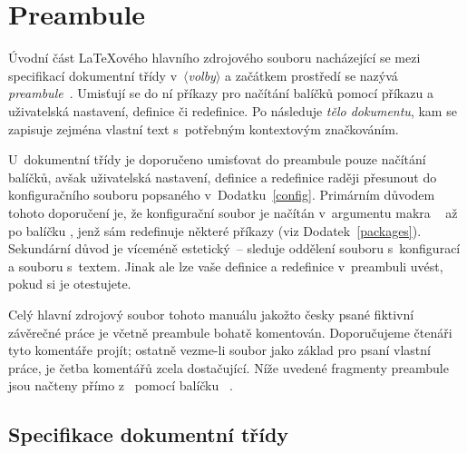 
\chapter{Preambule}\label{preamble}%

Úvodní část \LaTeX ového hlavního zdrojového souboru nacházející se mezi
specifikací dokumentní třídy v~\pgm{\textbackslash
  documentclass[}$\langle$\emph{volby}$\rangle$\pgm{]\{\ipotname\}} a začátkem
prostředí \verb!! se nazývá
  \emph{preambule}~\cite{Ryb:2005:LaTeX:3}. Umisťují se do ní příkazy pro
  načítání balíčků pomocí příkazu  a
  uživatelská nastavení, definice či redefinice. Po \verb!!
    následuje \emph{tělo dokumentu}, kam se zapisuje zejména vlastní text
s~potřebným kontextovým značkováním.

U~dokumentní třídy  je doporučeno umisťovat do preambule
pouze načítání balíčků, avšak uživatelská nastavení, definice a redefinice
raději přesunout do konfiguračního souboru  popsaného
v~Dodatku~\ref{config}. Primárním důvodem tohoto doporučení je, že
konfigurační soubor  je načítán v~argumentu makra
~\cite{Wri-Leh:LIVE:CTAN:etoolbox} až po
balíčku , jenž sám redefinuje některé příkazy (viz
Dodatek~\ref{packages}). Sekundární důvod je víceméně estetický~-- sleduje
oddělení souboru s~konfigurací a souboru s~textem. Jinak ale lze vaše definice
a redefinice v~preambuli uvést, pokud si je otestujete.

Celý hlavní zdrojový soubor  tohoto manuálu jakožto
česky psané fiktivní závěrečné práce je včetně preambule bohatě komentován.
Doporučujeme čtenáři tyto komentáře projít; ostatně vezme-li soubor
 jako základ pro psaní vlastní práce, je četba
komentářů zcela dostačující. Níže uvedené fragmenty preambule jsou načteny
přímo z~ pomocí balíčku
~\cite{Vos:LIVE:CTAN:fancyvrb}.

\section{Specifikace dokumentní třídy}\label{docclass}%

